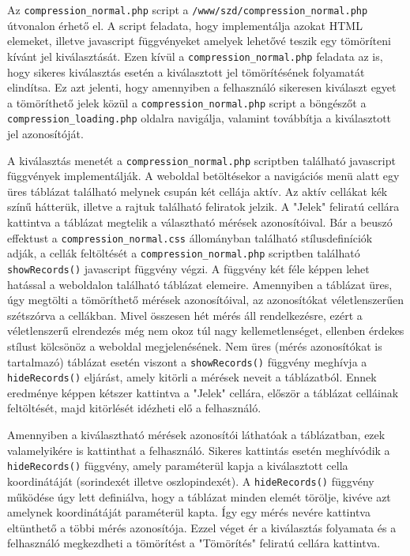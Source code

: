 \documentclass[oneside,titlepage,12pt,a4paper]{report}
\begin{document}
Az \texttt{compression\_normal.php} script a \texttt{/www/szd/compression\_normal.php} útvonalon érhető el. A script feladata, hogy implementálja azokat HTML elemeket, illetve javascript függvényeket amelyek lehetővé teszik egy tömöríteni kívánt jel kiválasztását. Ezen kívül a  \texttt{compression\_normal.php} feladata az is, hogy sikeres kiválasztás esetén a kiválasztott jel tömörítésének folyamatát elindítsa. Ez azt jelenti, hogy amennyiben a felhasználó sikeresen kiválaszt egyet a tömöríthető jelek közül a \texttt{compression\_normal.php} script a böngészőt a \texttt{compression\_loading.php} oldalra navigálja, valamint továbbítja a kiválasztott jel azonosítóját. 
\par A kiválasztás menetét a \texttt{compression\_normal.php} scriptben található javascript függvények implementálják. A weboldal betöltésekor a navigációs menü alatt egy üres táblázat található melynek csupán két cellája aktív. Az aktív cellákat kék színű hátterük, illetve a rajtuk található feliratok jelzik. A "Jelek" feliratú cellára kattintva a táblázat megtelik a választható mérések azonosítóival. Bár a beuszó effektust a \texttt{compression\_normal.css} állományban található stílusdefiníciók adják, a cellák feltöltését a \texttt{compression\_normal.php} scriptben található \texttt{showRecords()} javascript függvény végzi. A függvény két féle képpen lehet hatással a weboldalon található táblázat elemeire. Amennyiben a táblázat üres, úgy megtölti a tömöríthető mérések azonosítóival, az azonosítókat véletlenszerűen szétszórva a cellákban. Mivel összesen hét mérés áll rendelkezésre, ezért a véletlenszerű elrendezés még nem okoz túl nagy kellemetlenséget, ellenben érdekes stílust kölcsönöz a weboldal megjelenésének. Nem üres (mérés azonosítókat is tartalmazó) táblázat esetén viszont a \texttt{showRecords()} függvény meghívja a \texttt{hideRecords()} eljárást, amely kitörli a mérések neveit a táblázatból. Ennek eredménye képpen kétszer kattintva a "Jelek" cellára, először a táblázat celláinak feltöltését, majd kitörlését idézheti elő a felhasználó. 
\par Amennyiben a kiválasztható mérések azonosítói láthatóak a táblázatban, ezek valamelyikére is kattinthat a felhasználó. Sikeres kattintás esetén meghívódik a \texttt{hideRecords()} függvény, amely paraméterül kapja a kiválasztott cella koordinátáját (sorindexét illetve oszlopindexét). A \texttt{hideRecords()} függvény működése úgy lett definiálva, hogy a táblázat minden elemét törölje, kivéve azt amelynek koordinátáját paraméterül kapta. Így egy mérés nevére kattintva eltünthető a többi mérés azonosítója. Ezzel véget ér a kiválasztás folyamata és a felhasználó megkezdheti a tömörítést a "Tömörítés" feliratú cellára kattintva. 
\end{document}
